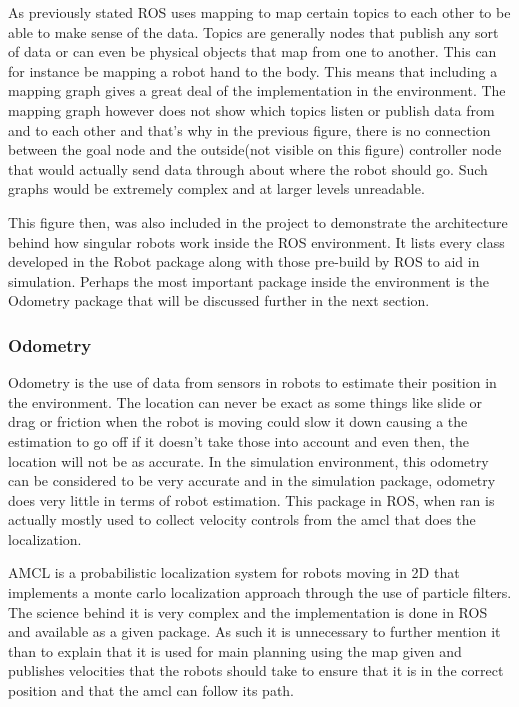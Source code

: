 \documentclass{report}
\begin{document}
        As previously stated ROS uses mapping to map certain topics to each other to be able to make sense of the data. Topics are generally nodes that publish any sort of data or can even be physical objects that map from one to another. This can for instance be mapping a robot hand to the body. This means that including a mapping graph gives a great deal of the implementation in the environment. The mapping graph however does not show which topics listen or publish data from and to each other and that's why in the previous figure, there is no connection between the goal node and the outside(not visible on this figure) controller node that would actually send data through about where the robot should go. Such graphs would be extremely complex and at larger levels unreadable.

        This figure then, was also included in the project to demonstrate the architecture behind how singular robots work inside the ROS environment. It lists every class developed in the Robot package along with those pre-build by ROS to aid in simulation. Perhaps the most important package inside the environment is the Odometry package that will be discussed further in the next section.

      \subsubsection{Odometry}
        Odometry is the use of data from sensors in robots to estimate their position in the environment. The location can never be exact as some things like slide or drag or friction when the robot is moving could slow it down causing a the estimation to go off if it doesn't take those into account and even then, the location will not be as accurate. In the simulation environment, this odometry can be considered to be very accurate and in the simulation package, odometry does very little in terms of robot estimation. This package in ROS, when ran is actually mostly used to collect velocity controls from the amcl that does the localization.

        AMCL is a probabilistic localization system for robots moving in 2D that implements a monte carlo localization approach through the use of particle filters. The science behind it is very complex and the implementation is done in ROS and available as a given package. As such it is unnecessary to further mention it than to explain that it is used for main planning using the map given and publishes velocities that the robots should take to ensure that it is in the correct position and that the amcl can follow its path.
\end{document}
